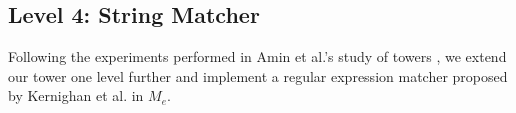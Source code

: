 \documentclass[a4paper,12pt,twoside,openright]{report}
\theoremstyle{definition}
\newcommand{\mevl}{$M_{e}$}
\begin{document}

\subsection{Level 4: String Matcher}\label{sec:string_matcher}
Following the experiments performed in Amin et al.'s study of towers \cite{amin2017collapsing}, we extend our tower one level further and implement a regular expression matcher proposed by Kernighan et al. \cite{kernighan2007regular} in \mevl{}.

\end{document}
